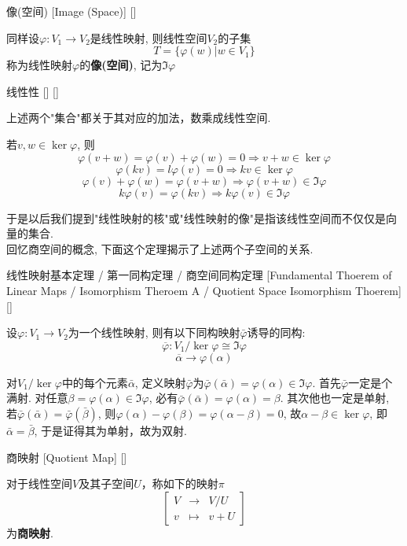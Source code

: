 \documentclass[UTF8]{ctexart}
\begin{document}
        \begin{dfn}
			[]
			{像(空间)}
			[Image (Space)]
			[]

            同样设$\varphi:V_1\to V_2$是线性映射, 则线性空间$V_2$的子集
            \[T=\{\varphi (w)|w\in V_1\}\]
            称为线性映射$\varphi$的\textbf{像(空间)}, 记为$\Im\varphi$
        \end{dfn}
        \begin{ppt}
			[]
			{线性性}
			[]
			[]

            上述两个"集合"都关于其对应的加法，数乘成线性空间.
        \end{ppt}
        \begin{prf}
            若$v,w\in \ker\varphi$, 则
            \[\varphi(v+w)=\varphi(v)+\varphi(w)=0\Longrightarrow v+w\in\ker\varphi\]
            \[\varphi(kv)=l\varphi(v)=0\Longrightarrow kv\in\ker\varphi\]
            \[\varphi(v)+\varphi(w)=\varphi(v+w)\Longrightarrow\varphi(v+w)\in\Im\varphi\]
            \[k\varphi(v)=\varphi(kv)\Longrightarrow k\varphi(v)\in\Im\varphi\]
        \end{prf}
        于是以后我们提到"线性映射的核"或"线性映射的像"是指该线性空间而不仅仅是向量的集合.\\
        回忆商空间的概念, 下面这个定理揭示了上述两个子空间的关系.
        
        \begin{thm}
			[]
			{线性映射基本定理 / 第一同构定理 / 商空间同构定理}
			[Fundamental Thoerem of Linear Maps / Isomorphism Theroem A / Quotient Space Isomorphism Thoerem]
			[]

			设$\varphi:V_1\to V_2$为一个线性映射, 则有以下同构映射$\bar{\varphi}$诱导的同构:
			\[\overline{\varphi}:V_1/\ker\varphi\cong\Im\varphi\]
			\[\overline{\alpha}\to\varphi(\alpha)\]
			\end{thm}
			\begin{prf}
			对$V_1/\ker\varphi$中的每个元素$\bar{\alpha}$, 定义映射$\bar{\varphi}$为$\bar{\varphi}(\bar{\alpha})=\varphi(\alpha)\in\Im\varphi$. 
			首先$\bar{\varphi}$一定是个满射. 对任意$\beta=\varphi(\alpha)\in\Im\varphi$, 必有$\bar{\varphi}(\bar{\alpha})=\varphi(\alpha)=\beta$. 其次他也一定是单射, 若$\bar{\varphi}(\bar{\alpha})=\bar{\varphi}(\bar{\beta})$, 则$\varphi(\alpha)-\varphi(\beta)=\varphi(\alpha-\beta)=0$, 故$\alpha-\beta\in\ker\varphi$, 即$\bar{\alpha}=\bar{\beta}$, 于是证得其为单射，故为双射.
        \end{prf}

		\begin{dfn}
			[]
			{商映射}
			[Quotient Map]
			[]

			对于线性空间$V$及其子空间$U$，称如下的映射$\pi$
			\[\begin{bmatrix}
				V&\to&V/U\\
				v&\mapsto&v+U 
			\end{bmatrix}\]
			为\textbf{商映射}.
		\end{dfn}
\end{document}
